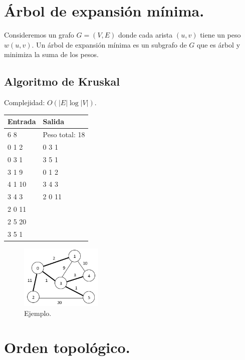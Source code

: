 \documentclass[12pt, letterpaper, twoside]{article}
\begin{document}
\newpage

\section{Árbol de expansión mínima.}

Consideremos un grafo $G = (V, E)$ donde cada arista $(u, v)$ tiene un peso $w(u,v)$. Un árbol de expansión mínima es un subgrafo de $G$ que es árbol y minimiza la suma de los pesos.

\subsection{Algoritmo de Kruskal}

Complejidad: $O(|E| \log|V|)$.

 \medskip

\begin{tabular}{|p{7cm}|p{7cm}|}
\hline
\textbf{Entrada} & \textbf{Salida}\\ \hline
6 8    & Peso total: 18\\
0 1 2  & 0 3 1\\
0 3 1  & 3 5 1\\
3 1 9  & 0 1 2\\
4 1 10 & 3 4 3\\
3 4 3  & 2 0 11\\
2 0 11 & \\
2 5 20 & \\
3 5 1  & \\ \hline
\end{tabular}

\begin{figure}[h]
\centering
\includegraphics[width = 0.35\textwidth]{MST.png}

\caption{Ejemplo.}
\end{figure}

\newpage

\section{Orden topológico.}
\end{document}
